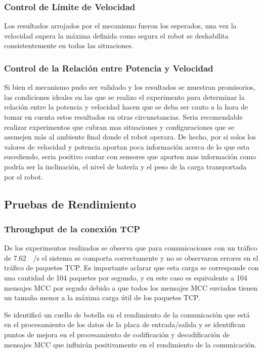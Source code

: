 \documentclass[withindex,glossary]{cam-thesis}
\begin{document}
\subsubsection{Control de Límite de Velocidad}
Los resultados arrojados por el mecanismo fueron los esperados, una vez la velocidad supera la máxima definida como segura el robot se deshabilita consistentemente en todas las situaciones.
\subsubsection{Control de la Relación entre Potencia y Velocidad}
Si bien el mecanismo pudo ser validado y los resultados se muestran promisorios, las condiciones ideales en las que se realizo el experimento para determinar la relación entre la potencia y velocidad hacen que se deba ser cauto a la hora de tomar en cuenta estos resultados en otras circunstancias. Seria recomendable realizar experimentos que cubran mas situaciones y configuraciones que se asemejen más al ambiente final donde el robot operara. De hecho, por si solos los valores de velocidad y potencia aportan poca información acerca de lo que esta sucediendo, seria positivo contar con sensores que aporten mas información como podría ser la inclinación, el nivel de batería y el peso de la carga transportada por el robot.
\subsection{Pruebas de Rendimiento}
\subsubsection{Throughput de la conexión TCP}
De los experimentos realizados se observa que para comunicaciones con un tráfico de \SI{7.62}{\kilo\byte/\second} el sistema se comporta correctamente y no se observaron errores en el tráfico de paquetes TCP. Es importante aclarar que esta carga se corresponde con una cantidad de 104 paquetes por segundo, y en este caso es equivalente a 104 mensajes MCC por segudo debido a que todos los mensajes MCC enviados tienen un tamaño menor a la máxima carga útil de los paquetes TCP.

Se identificó un cuello de botella en el rendimiento de la comunicación que está en el procesamiento de los datos de la placa de entrada/salida y se identifican puntos de mejora en el procesamiento de codificación y decodificación de mensajes MCC que influirán positivamente en el rendimiento de la comunicación.
\end{document}
